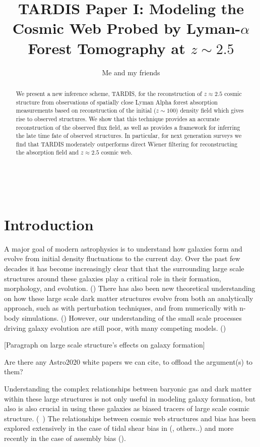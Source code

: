 \documentclass[times]{aastex62}
\begin{document}
\title{TARDIS Paper I: Modeling the Cosmic Web Probed by Lyman-$\alpha$
Forest Tomography at $z\sim 2.5$}
\author{Me and my friends}


\begin{abstract}
We present a new inference scheme, TARDIS, for the reconstruction of $z \approx 2.5$ cosmic structure from observations of spatially close Lyman Alpha forest absorption measurements based on reconstruction of the initial ($z \sim 100$) density field which gives rise to observed structures. We show that this technique provides an accurate reconstruction of the observed flux field, as well as provides a framework for inferring the late time fate of observed structures. In particular, for next generation surveys we find that TARDIS moderately outperforms direct Wiener filtering for reconstructing the absorption field and $z\approx 2.5$ cosmic web.
\end{abstract}
\
\section{Introduction}


A major goal of modern astrophysics is to understand how galaxies form and evolve from initial density fluctuations to the current day. Over the past few decades it has become increasingly clear that that the surrounding large scale structures around these galaxies play a critical role in their formation, morphology, and evolution. (\cite{1980Dressler,2004Kauffmann}) There has also been new theoretical understanding on how these large scale dark matter structures evolve from both an analytically approach, such as with perturbation techniques, and from numerically with n-body simulations. (\cite{reviewGal2}) However, our understanding of the small scale processes driving galaxy evolution are still poor, with many competing models. (\cite{reviewGal2,reviewGal})

[Paragraph on large scale structure's effects on galaxy formation]

{\color{red}Are there any Astro2020 white papers we can cite, to offload the argument(s) to them?}

Understanding the complex relationships between baryonic gas and dark matter within these large structures is not only useful in modeling galaxy formation, but also is also crucial in using these galaxies as biased tracers of large scale cosmic structure. (~\cite{galaxybias}) The relationships between cosmic web structures and bias has been explored extensively in the case of tidal shear bias in (\cite{2012Baldauf}, others..)
and more recently in the case of assembly bias (\cite{2019Ramakrishnan}).
\end{document}
